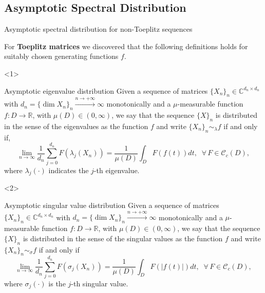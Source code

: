 \documentclass[aspectratio=169,xcolor=dvipsnames]{beamer}
\begin{document}
\subsection{Asymptotic Spectral Distribution}

\begin{frame}{\Large Asymptotic spectral distribution for non-Toeplitz sequences}

For \textbf{Toeplitz matrices} we discovered that the following definitions holds for suitably chosen generating functions $f$.
\begin{onlyenv}<1>
\begin{block}{Asymptotic eigenvalue distribution}
	Given a sequence of matrices
	$\{X_n\}_n \in \mathbb{C}^{d_n\times d_n}$
	with $d_n = \{\dim X_n\}_n \overset{ n \rightarrow
		+\infty}{\longrightarrow} \infty$ monotonically and a
	$\mu$-measurable function $f : D \rightarrow \mathbb{R}$, with
	$\mu(D) \in (0,\infty)$, we say that the sequence $\{X\}_n$ is
	distributed  in the sense of the eigenvalues as the function $f$ and
	write $\{X_n\}_n \sim_{\lambda} f$ if and only if,
	\begin{equation*}
		\lim_{n \rightarrow \infty} \frac{1}{d_n} \sum_{j = 0}^{d_n}
		F(\lambda_j(X_n)) = \frac{1}{\mu(D)} \int_{D}F(f(t))dt, \;\; \forall
		\, F \in \mathcal{C}_c(D),
	\end{equation*}
	where $\lambda_j(\cdot)$ indicates the $j$-th eigenvalue.
\end{block}
\end{onlyenv}
\begin{onlyenv}<2>
\begin{block}{Asymptotic singular value distribution}
	Given a sequence of matrices $\{X_n\}_n \in \mathbb{C}^{d_n \times
		d_n}$
	with $d_n = \{\dim X_n\}_n \overset{ n \rightarrow
		+\infty}{\longrightarrow} \infty$ monotonically and a $\mu$-measurable
	function $f : D \rightarrow \mathbb{R}$, with $\mu(D) \in (0,\infty)$,
	we say that the sequence $\{X\}_n$ is distributed
	in the sense of the singular values as the function $f$ and write
	$\{X_n\}_n \sim_{\sigma} f$ if and only if
	\begin{equation*}
		\lim_{n \rightarrow \infty} \frac{1}{d_n} \sum_{j = 0}^{d_n}
		F(\sigma_j(X_n)) = \frac{1}{\mu(D)} \int_{D}F(|f(t)|)dt, \;\; \forall
		\, F \in \mathcal{C}_c(D),
	\end{equation*}
	where $\sigma_j(\cdot)$ is the $j$-th singular value.
\end{block}
\end{onlyenv}
\end{frame}
\end{document}
